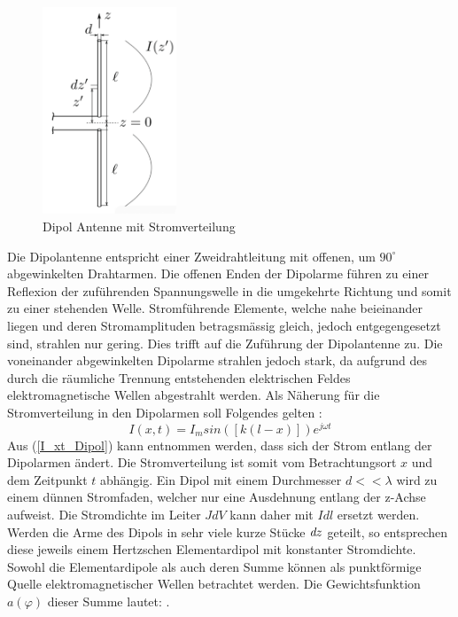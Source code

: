 \begin{figure}[!ht]
	\centering
	\includegraphics[width=4cm]{content/bilder/Dipol_EMANT_S42.pdf}%
	\caption{Dipol Antenne mit Stromverteilung \cite{Tekom}}
	\label{FitzDipol}
\end{figure}
Die Dipolantenne entspricht einer Zweidrahtleitung mit offenen, um $90^\circ$ abgewinkelten Drahtarmen. Die offenen Enden der Dipolarme führen zu einer Reflexion der zuführenden Spannungswelle in die umgekehrte Richtung und somit zu einer stehenden Welle. Stromführende Elemente, welche nahe beieinander liegen und deren Stromamplituden betragsmässig gleich, jedoch entgegengesetzt sind, strahlen nur gering. Dies trifft auf die Zuführung der Dipolantenne zu. Die voneinander abgewinkelten Dipolarme strahlen jedoch stark, da aufgrund des durch die räumliche Trennung entstehenden elektrischen Feldes elektromagnetische Wellen abgestrahlt werden.
Als Näherung für die Stromverteilung in den Dipolarmen soll Folgendes gelten \cite{elliott1981antenna}:
\begin{equation}\label{I_xt_Dipol} 
I(x,t) =I_{m}sin([k(l-x)])e^{j\omega t}
\end{equation}
Aus  (\ref{I_xt_Dipol}) kann entnommen werden, dass sich der Strom entlang der Dipolarmen ändert. Die Stromverteilung ist somit vom Betrachtungsort $x$ und dem Zeitpunkt $t$ abhängig. Ein Dipol mit einem Durchmesser $d<<\lambda$ wird  zu einem dünnen Stromfaden, welcher nur eine Ausdehnung entlang der z-Achse aufweist. Die Stromdichte im Leiter $J \textit{d}V$ kann daher mit $I\textit{d}l$ ersetzt werden. Werden die Arme des Dipols in sehr viele kurze Stücke $\textit{\textit{d}}z$ geteilt, so entsprechen diese jeweils einem Hertzschen Elementardipol mit konstanter Stromdichte. Sowohl die Elementardipole als auch deren Summe können als punktförmige Quelle elektromagnetischer Wellen betrachtet werden. Die Gewichtsfunktion $a(\varphi)$ dieser Summe lautet: \cite{elliott1981antenna}.\\

